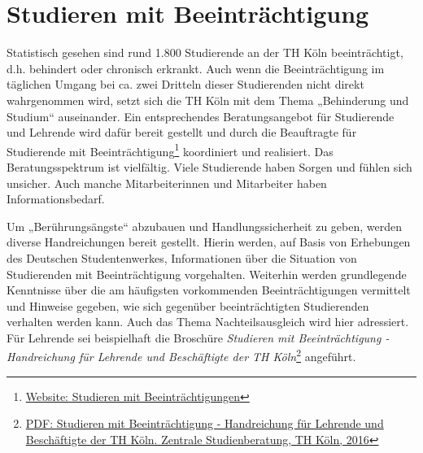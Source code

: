 \section{Studieren mit
Beeinträchtigung}\label{studieren-mit-beeintruxe4chtigung}

Statistisch gesehen sind rund 1.800 Studierende an der TH Köln
beeinträchtigt, d.h. behindert oder chronisch erkrankt. Auch wenn die
Beeinträchtigung im täglichen Umgang bei ca. zwei Dritteln dieser
Studierenden nicht direkt wahrgenommen wird, setzt sich die TH Köln mit
dem Thema „Behinderung und Studium`` auseinander. Ein entsprechendes
Beratungsangebot für Studierende und Lehrende wird dafür bereit gestellt
und durch die Beauftragte für Studierende mit Beeinträchtigung\footnote{\href{https://www.th-koeln.de/studium/studieren-mit-beeintraechtigung_169.php}{Website:
  Studieren mit Beeinträchtigungen}} koordiniert und realisiert. Das
Beratungsspektrum ist vielfältig. Viele Studierende haben Sorgen und
fühlen sich unsicher. Auch manche Mitarbeiterinnen und Mitarbeiter haben
Informationsbedarf.

Um „Berührungsängste`` abzubauen und Handlungssicherheit zu geben,
werden diverse Handreichungen bereit gestellt. Hierin werden, auf Basis
von Erhebungen des Deutschen Studentenwerkes, Informationen über die
Situation von Studierenden mit Beeinträchtigung vorgehalten. Weiterhin
werden grundlegende Kenntnisse über die am häufigsten vorkommenden
Beeinträchtigungen vermittelt und Hinweise gegeben, wie sich gegenüber
beeinträchtigten Studierenden verhalten werden kann. Auch das Thema
Nachteilsausgleich wird hier adressiert. Für Lehrende sei beispielhaft
die Broschüre \emph{Studieren mit Beeinträchtigung - Handreichung für
Lehrende und Beschäftigte der TH Köln}\footnote{\href{https://www.th-koeln.de/mam/downloads/deutsch/studium/beratung/beeintraechtigung/a5brosch__re_beeintr__chtigung_2016.pdf}{PDF:
  Studieren mit Beeinträchtigung - Handreichung für Lehrende und
  Beschäftigte der TH Köln. Zentrale Studienberatung, TH Köln, 2016}}
angeführt.
